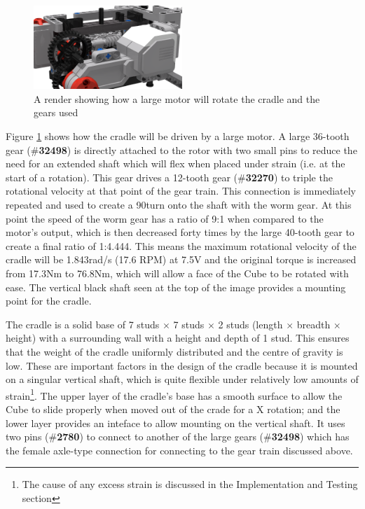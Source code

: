 \documentclass{report}
\newcommand{\legopiece}[1]{(\#\textbf{#1})}
\begin{document}
	\begin{figure}[h!]
		\begin{center}
			\includegraphics[width=0.5\textwidth]{Resources/Images/rdrWormGear.png}
			\caption{A render showing how a large motor will rotate the cradle and the gears used}
			\label{fig:rdrWormGear}
		\end{center}
	\end{figure}

	Figure \ref{fig:rdrWormGear} shows how the cradle will be driven by a large motor. A large 36-tooth gear \legopiece{32498} is directly attached to the rotor with two small pins to reduce the need for an extended shaft which will flex when placed under strain (i.e. at the start of a rotation). This gear drives a 12-tooth gear \legopiece{32270} to triple the rotational velocity at that point of the gear train. This connection is immediately repeated and used to create a 90\degree turn onto the shaft with the worm gear. At this point the speed of the worm gear has a ratio of 9:1 when compared to the motor's output, which is then decreased forty times by the large 40-tooth gear to create a final ratio of 1:4.444. This means the maximum rotational velocity of the cradle will be 1.843rad/s (17.6 RPM) at 7.5V and the original torque is increased from 17.3Nm to 76.8Nm, which will allow a face of the Cube to be rotated with ease. The vertical black shaft seen at the top of the image provides a mounting point for the cradle.
	
	The cradle is a solid base of 7 studs $\times$ 7 studs $\times$ 2 studs (length $\times$ breadth $\times$ height) with a surrounding wall with a height and depth of 1 stud. This ensures that the weight of the cradle uniformly distributed and the centre of gravity is low. These are important factors in the design of the cradle because it is mounted on a singular vertical shaft, which is quite flexible under relatively low amounts of strain\footnote{The cause of any excess strain is discussed in the Implementation and Testing section}. The upper layer of the cradle's base has a smooth surface to allow the Cube to slide properly when moved out of the crade for a X rotation; and the lower layer provides an inteface to allow mounting on the vertical shaft. It uses two pins \legopiece{2780} to connect to another of the large gears \legopiece{32498} which has the female axle-type connection for connecting to the gear train discussed above.
   
\end{document}

